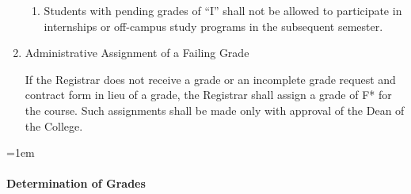 \documentclass{manual}
\let\oldparagraph\paragraph
\renewcommand\paragraph{\leftskip=1em\oldparagraph}
\newcommand{\itemLevelA}{\alph*.}
\newcommand{\itemLevelB}{\arabic*)}
\newcommand{\itemRefA}{\alph*}
\newcommand{\itemRefB}{\arabic*}
\begin{document}
\begin{enumerate}[label=\itemLevelA,ref=\itemRefA]
\begin{enumerate}[label=\itemLevelB,ref=\itemRefB]
\item Students with pending grades of ``I'' shall not be allowed to participate in internships or off-campus study programs in the subsequent semester.
\end{enumerate}
\item Administrative Assignment of a Failing Grade

If the Registrar does not receive a grade or an incomplete grade request and contract form in lieu of a grade, the Registrar shall assign a grade of F* for the course. Such assignments shall be made only with approval of the Dean of the College.
\end{enumerate}


\paragraph{Determination of Grades}\label{par:DeterminationOfGrades}
\end{document}
